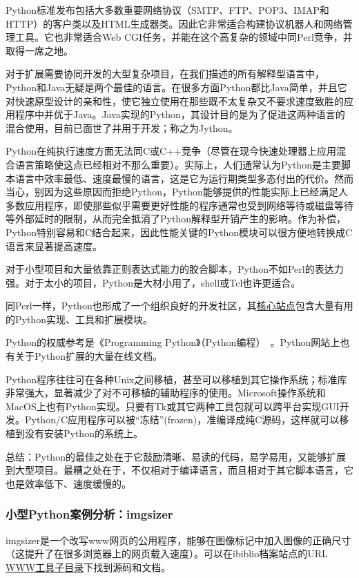 \documentclass[12pt,oneside]{ctexbook}
\begin{document}
\begin{common-format}
Python标准发布包括大多数重要网络协议（SMTP、FTP、POP3、IMAP和HTTP）的客户类以及HTML生成器类。因此它非常适合构建协议机器人和网络管理工具。它也非常适合Web CGI任务，并能在这个高复杂的领域中同Perl竞争，并取得一席之地。

对于扩展需要协同开发的大型复杂项目，在我们描述的所有解释型语言中，Python和Java无疑是两个最佳的语言。在很多方面Python都比Java简单，并且它对快速原型设计的亲和性，使它独立使用在那些既不太复杂又不要求速度致胜的应用程序中并优于Java。Java实现的Python，其设计目的是为了促进这两种语言的混合使用，目前已面世了并用于开发；称之为Jython。

Python在纯执行速度方面无法同C或C++竞争（尽管在现今快速处理器上应用混合语言策略使这点已经相对不那么重要）。实际上，人们通常认为Python是主要脚本语言中效率最低、速度最慢的语言，这是它为运行期类型多态付出的代价。然而当心，别因为这些原因而拒绝Python，Python能够提供的性能实际上已经满足人多数应用程序，即使那些似乎需要更好性能的程序通常也受到网络等待或磁盘等待等外部延时的限制，从而完全抵消了Python解释型开销产生的影响。作为补偿，Python特别容易和C结合起来，因此性能关键的Python模块可以很方便地转换成C语言来显著提高速度。

对于小型项目和大量依靠正则表达式能力的胶合脚本，Python不如Perl的表达力强。对于太小的项目，Python是大材小用了，shell或Tcl也许更适合。

同Perl一样，Python也形成了一个组织良好的开发社区，其\href{http://www.python.org/}{核心站点}包含大量有用的Python实现、工具和扩展模块。

Python的权威参考是《Programming Python》（Python编程）~\cite{Lutz}。Python网站上也有关于Python扩展的大量在线文档。

Python程序往往可在各种Unix之间移植，甚至可以移植到其它操作系统；标准库非常强大，显著减少了对不可移植的辅助程序的使用。Microsoft操作系统和MacOS上也有Python实现。只要有Tk或其它两种工具包就可以跨平台实现GUI开发。Python/C应用程序可以被“冻结”(frozen)，准编译成纯C源码，这样就可以移植到没有安装Python的系统上。

总结：Python的最佳之处在于它鼓励清晰、易读的代码，易学易用，又能够扩展到大型项目。最糟之处在于，不仅相对于编译语言，而且相对于其它脚本语言，它也是效率低下、速度缓慢的。

\subsubsection{小型Python案例分析：imgsizer}
imgsizer是一个改写www网页的公用程序，能够在图像标记中加入图像的正确尺寸（这提升了在很多浏览器上的网页载入速度）。可以在ibiblio档案站点的URL \href{http://www.ibiblio.org/}{WWW工具子目录}下找到源码和文档。


\end{common-format}
\end{document}
